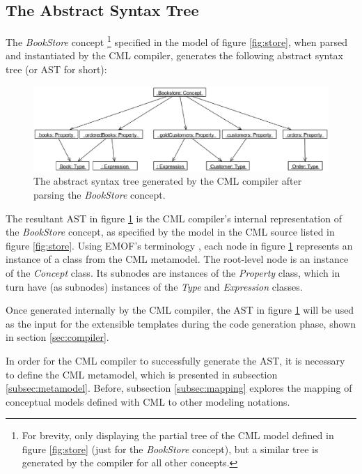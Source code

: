 \subsection{The Abstract Syntax Tree}\label{subsec:ast}

The \emph{BookStore} concept
\footnote{For brevity,
only displaying the partial tree of the CML model defined in figure \ref{fig:store} (just for the \emph{BookStore} concept), 
but a similar tree is generated by the compiler for all other concepts.}
specified in the model of figure \ref{fig:store},
when parsed and instantiated by the CML compiler,
generates the following abstract syntax tree (or AST for short):

\begin{figure}
\centering
\includegraphics[width=\textwidth]{language/figure-ast}
\caption{The abstract syntax tree generated by the CML compiler after parsing the \emph{BookStore} concept.}
\label{fig:ast}
\end{figure}

The resultant AST in figure \ref{fig:ast} is the CML compiler's internal representation of the \emph{BookStore} concept,
as specified by the model in the CML source listed in figure \ref{fig:store}. 
Using EMOF's terminology \cite{mof},
each node in figure \ref{fig:ast} represents an instance of a class from the CML metamodel.
The root-level node is an instance of the \emph{Concept} class. 
Its subnodes are instances of the \emph{Property} class,
which in turn have (as subnodes) instances of the \emph{Type} and \emph{Expression} classes.

Once generated internally by the CML compiler,
the AST in figure \ref{fig:ast} will be used as the input for the extensible templates during the code generation phase,
shown in section \ref{sec:compiler}.

In order for the CML compiler to successfully generate the AST,
it is necessary to define the CML metamodel,
which is presented in subsection \ref{subsec:metamodel}.
Before, subsection \ref{subsec:mapping} explores the mapping of conceptual models defined with CML to other modeling notations.


